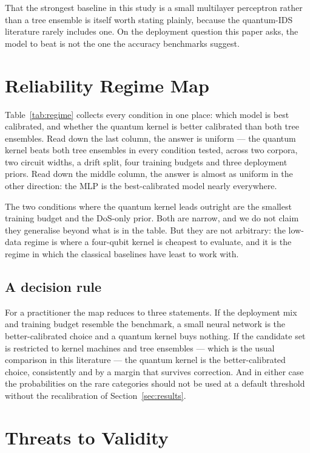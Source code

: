 \documentclass[journal]{IEEEtran}
\begin{document}
That the strongest baseline in this study is a small multilayer perceptron
rather than a tree ensemble is itself worth stating plainly, because the
quantum-IDS literature rarely includes one. On the deployment question this
paper asks, the model to beat is not the one the accuracy benchmarks
suggest.

\section{Reliability Regime Map}\label{sec:regime}



Table~\ref{tab:regime} collects every condition in one place: which model is
best calibrated, and whether the quantum kernel is better calibrated than
both tree ensembles. Read down the last column, the answer is uniform ---
the quantum kernel beats both tree ensembles in every condition tested,
across two corpora, two circuit widths, a drift split, four training
budgets and three deployment priors. Read down the middle column, the
answer is almost as uniform in the other direction: the MLP is the
best-calibrated model nearly everywhere.

The two conditions where the quantum kernel leads outright are the smallest
training budget and the DoS-only prior. Both are narrow, and we do not
claim they generalise beyond what is in the table. But they are not
arbitrary: the low-data regime is where a four-qubit kernel is cheapest to
evaluate, and it is the regime in which the classical baselines have least
to work with.

\subsection*{A decision rule}
For a practitioner the map reduces to three statements. If the deployment
mix and training budget resemble the benchmark, a small neural network is
the better-calibrated choice and a quantum kernel buys nothing. If the
candidate set is restricted to kernel machines and tree ensembles --- which
is the usual comparison in this literature --- the quantum kernel is the
better-calibrated choice, consistently and by a margin that survives
correction. And in either case the probabilities on the rare categories
should not be used at a default threshold without the recalibration of
Section~\ref{sec:results}.

\section{Threats to Validity}\label{sec:limits}
\end{document}
